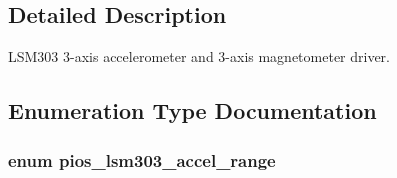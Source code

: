 \subsection{\-Detailed \-Description}
\-L\-S\-M303 3-\/axis accelerometer and 3-\/axis magnetometer driver. 

\subsection{\-Enumeration \-Type \-Documentation}
\hypertarget{group___p_i_o_s___l_s_m303_gafbb0e59427f40a8d9b0e901af02bb7b3}{
\subsubsection[{pios\-\_\-lsm303\-\_\-accel\-\_\-range}]{\setlength{\rightskip}{0pt plus 5cm}enum {\bf pios\-\_\-lsm303\-\_\-accel\-\_\-range}}}\label{group___p_i_o_s___l_s_m303_gafbb0e59427f40a8d9b0e901af02bb7b3}
